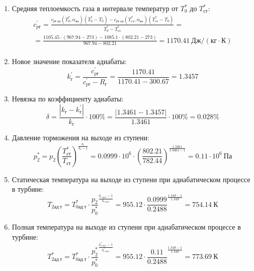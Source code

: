 \documentclass[a4paper,12pt]{article}
\begin{document}
\begin{enumerate}
        \item Средняя теплоемкость газа в интервале температур от $T_0^*$ до $T_{ст}^*$:
        \begin{gather*}
            c_{pг}^\prime = \frac{
		        c_{pг\ ср} (T_0^*, \alpha_{вх}) (T_0^* - T_0) - c_{pг\ ср} (T_{ст}^*, \alpha_{вх})(T_{ст}^* - T_0)
		    }{
		        T_0^* - T_{ст}^*} =\\
            =\frac{
		        1105.45 \cdot
                (967.94 - 273) -
		        1085.1 \cdot
                (802.21 - 273)
		    }{
		        967.94 - 802.21} =
		    1170.41 \ Дж / (кг \cdot К)\\
        \end{gather*}

        \item Новое значение показателя адиабаты:
        \[
            k_г^\prime = \frac{c_{pг}^\prime}{c_{pг}^\prime - R_г} =
                \frac{
                    1170.41
                }{
                    1170.41 - 300.67
                }
            = 1.3457
        \]

        \item Невязка по коэффициенту адиабаты:
        \[
            \delta = \frac{ \left| k_г - k_г^\prime \right| }{ k_г } \cdot 100 \%=
                \frac{
                    \left| 1.3461 - 1.3457 \right|
                }{
                    1.3461
                } \cdot 100 \% =
            0.028 \%
        \]

        \item Давление торможения на выходе из ступени:
        \[
            p_2^* = p_2 \left(
                            \frac{ T_{ст}^* }{ T_{ст} }
                    \right) ^ \frac{ k_г }{ k_г - 1 } =
                 0.0999 \cdot 10^6 \cdot \left(
                            \frac{ 802.21 }{ 782.44 }
                    \right) ^
                \frac{ 1.3461 }{ 1.3461 - 1 } =
            0.11 \cdot 10^6 \ Па
        \]

        \item Статическая температура на выходе из ступени при адиабатическом процессе в турбине:
        \[
            T_{2ад\ т} = T_{0ад\ т}^* \cdot \frac{p_2}{p_0^*} ^ {
                    \frac{k_{г\ ад\ т} - 1}{k_{г\ ад\ т} }
            } = 955.12 \cdot
            \frac{ 0.0999
            }{
            0.2488
            } ^ {
                    \frac{1.349 - 1}{1.349}
            } =
            754.14\ К
        \]

        \item Полная температура на выходе из ступени при адиабатическом процессе в турбине:
        \[
            T_{2ад\ т}^* = T_{0ад\ т}^* \cdot \frac{p_2^*}{p_0^*} ^ {
                    \frac{k_{г\ ад\ т}^* - 1}{k_{г\ ад\ т}^*}
            } = 955.12 \cdot
            \frac{ 0.11
            }{
            0.2488
            } ^ {
                    \frac{1.348 - 1}{1.348}
            } =
            773.69\ К
        \]


\end{enumerate}
\end{document}
